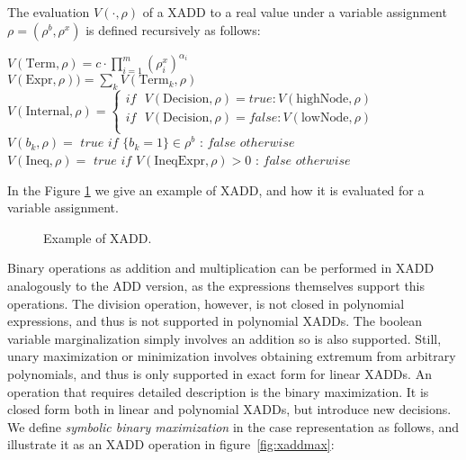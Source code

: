 The evaluation $V(\cdot, \rho)$ of a XADD to a real value under a variable assignment $\rho = (\rho^b,\rho^x)$ is defined recursively as follows:

{\footnotesize
$V(\text{Term},\rho) = c \cdot \prod_{i=1}^m { (\rho^x_i)^{\alpha_i}}$\\
$V(\text{Expr},\rho)) = \sum_k V(\text{Term}_k, \rho)$\\
$V(\text{Internal},\rho) = \begin{cases} 
if \text{ }V(\text{Decision},\rho) = true:  V(\text{highNode},\rho)\\
if \text{ }V(\text{Decision},\rho) = false:  V(\text{lowNode},\rho)\\
\end{cases} $\\
$V(b_k, \rho) =$ $true$ $if$ $\{ b_k = 1\} \in \rho^b$ : $false$ $otherwise$\\
$V(\text{Ineq},\rho) =$ $true$ $if$ $V(\text{IneqExpr},\rho) > 0 $ : $false$ $otherwise$\\
}

In the Figure \ref{fig:xaddex} we give an example of XADD, and how it is evaluated for a variable assignment.

\begin{figure}[h!t]
\center
{}
\caption{ Example of XADD.}
\label{fig:xaddex} 
\end{figure}






Binary operations as addition and multiplication can be performed in
XADD analogously to the ADD version, as the expressions themselves
support this operations. The division operation, however, is not
closed in polynomial expressions, and thus is not supported in
polynomial XADDs. The boolean variable marginalization simply involves
an addition so is also supported. Still, unary maximization or
minimization involves obtaining extremum from arbitrary polynomials,
and thus is only supported in exact form for linear XADDs. An
operation that requires detailed description is the binary
maximization. It is closed form both in linear and polynomial XADDs,
but introduce new decisions. We define \emph{symbolic binary
maximization} in the case representation as follows, and illustrate it
as an XADD operation in figure~\ref{fig:xaddmax}:

